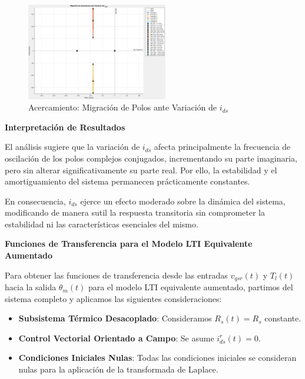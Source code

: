 \documentclass{article}
\begin{document}
\begin{figure}[H]
    \centering
    \includegraphics[width=0.55\textwidth]{Imagenes/MigracionLPV_2.png}
    \caption{Acercamiento: Migración de Polos ante Variación de \( i_{ds} \)}
    \label{fig:migracion_polos_i_ds}
\end{figure}

\textbf{Interpretación de Resultados}

El análisis sugiere que la variación de \( i_{ds} \) afecta principalmente la frecuencia de oscilación de los polos complejos conjugados, incrementando su parte imaginaria, pero sin alterar significativamente su parte real. Por ello, la estabilidad y el amortiguamiento del sistema permanecen prácticamente constantes.

En consecuencia, \( i_{ds} \) ejerce un efecto moderado sobre la dinámica del sistema, modificando de manera sutil la respuesta transitoria sin comprometer la estabilidad ni las características esenciales del mismo.


\newpage

\noindent\textbf{Funciones de Transferencia para el Modelo LTI Equivalente Aumentado}

Para obtener las funciones de transferencia desde las entradas \( v_{qsr}(t) \) y \( T_l(t) \) hacia la salida \( \theta_m(t) \) para el modelo LTI equivalente aumentado, partimos del sistema completo y aplicamos las siguientes consideraciones:

\begin{itemize}
    \item \textbf{Subsistema Térmico Desacoplado}: Consideramos \( R_s(t) = R_s \) constante.
    \item \textbf{Control Vectorial Orientado a Campo}: Se asume \( i_{ds}^r(t) = 0 \).
    \item \textbf{Condiciones Iniciales Nulas}: Todas las condiciones iniciales se consideran nulas para la aplicación de la transformada de Laplace.
\end{itemize}
\end{document}
